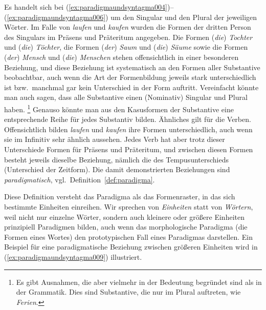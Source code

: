 Es handelt sich bei (\ref{ex:paradigmaundsyntagma004})--(\ref{ex:paradigmaundsyntagma006}) um den Singular und den Plural der jeweiligen Wörter.
Im Falle von \textit{laufen} und \textit{kaufen} wurden die Formen der dritten Person des Singulars im Präsens und Präteritum angegeben.
Die Formen (\textit{die}) \textit{Tochter} und (\textit{die}) \textit{Töchter}, die Formen (\textit{der}) \textit{Saum} und (\textit{die}) \textit{Säume} sowie die Formen (\textit{der}) \textit{Mensch} und (\textit{die}) \textit{Menschen} stehen offensichtlich in einer besonderen Beziehung, und diese Beziehung ist systematisch an den Formen aller Substantive beobachtbar, auch wenn die Art der Formenbildung jeweils stark unterschiedlich ist bzw.\ manchmal gar kein Unterschied in der Form auftritt.
Vereinfacht könnte man auch sagen, dass alle Substantive einen (Nominativ) Singular und Plural haben.%
\footnote{Es gibt Ausnahmen, die aber vielmehr in der Bedeutung begründet sind als in der Grammatik.
Dies sind \zB Substantive, die nur im Plural auftreten, wie \textit{Ferien}.}
Genauso könnte man aus den Kasusformen der Substantive eine entsprechende Reihe für jedes Substantiv bilden.
Ähnliches gilt für die Verben.
Offensichtlich bilden \textit{laufen} und \textit{kaufen} ihre Formen unterschiedlich, auch wenn sie im Infinitiv sehr ähnlich aussehen.
Jedes Verb hat aber trotz dieser Unterschiede Formen für Präsens und Präteritum, und zwischen diesen Formen besteht jeweils dieselbe Beziehung, nämlich die des Tempusunterschieds (Unterschied der Zeitform).
Die damit demonstrierten Beziehungen sind \textit{paradigmatisch}, vgl.\ Definition~\ref{def:paradigma}.


Diese Definition versteht das Paradigma als das Formenraster, in das sich bestimmte Einheiten einreihen.
Wir sprechen von \textit{Einheiten} statt von \textit{Wörtern}, weil nicht nur einzelne Wörter, sondern auch kleinere oder größere Einheiten prinzipiell Paradigmen bilden, auch wenn das morphologische Paradigma (die Formen eines Wortes) den prototypischen Fall eines Paradigmas darstellen.
Ein Beispiel für eine paradigmatische Beziehung zwischen größeren Einheiten wird in (\ref{ex:paradigmaundsyntagma009}) illustriert.

